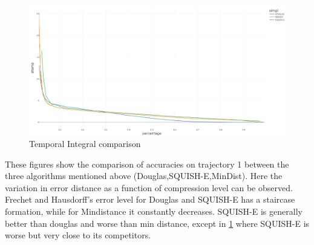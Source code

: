 \begin{figure}[!h]
	\centering
	\includegraphics[width=1\linewidth]{figures/Stats/atemp_comp.jpg}
	\caption{Temporal Integral comparison}
	\label{fig:comp_at}
\end{figure}

These figures show the comparison of accuracies on trajectory 1 between the three algorithms mentioned above (Douglas,SQUISH-E,MinDist). Here the variation in error distance as a function of compression level can be observed. Frechet and Hausdorff's error level for Douglas and SQUISH-E has a staircase formation, while for Mindistance it constantly decreases. SQUISH-E is generally better than douglas and worse than min distance, except in \ref{fig:comp_at} where SQUISH-E is worse but very close to its competitors.
